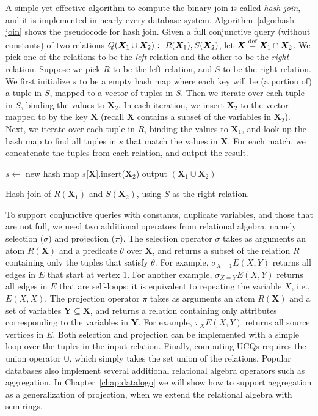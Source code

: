 A simple yet effective algorithm to compute the binary join is called {\em hash join},
 and it is implemented in nearly every database system.
Algorithm~\ref{algo:hash-join} shows the pseudocode for hash join.
Given a full conjunctive query (without constants) 
 of two relations $Q({\bm X_1} \cup {\bm X_2}) \text{ :- } R({\bm X_1}), S({\bm X_2})$,
 let ${\bm X} \stackrel{\text{def}}{=} {\bm X_1} \cap {\bm X_2}$.
We pick one of the relations to be the {\em left} relation and the other to be the {\em right} relation.
Suppose we pick $R$ to be the left relation, and $S$ to be the right relation.
We first initialize $s$ to be a empty hash map
 where each key will be (a portion of) a tuple in $S$,
 mapped to a vector of tuples in $S$.
Then we iterate over each tuple in $S$, 
 binding the values to ${\bm X_2}$.
In each iteration,
 we insert ${\bm X_2}$ to the vector mapped to by the key ${\bm X}$ (recall ${\bm X}$ contains a subset of the variables in ${\bm X_2}$).
Next, we iterate over each tuple in $R$,
 binding the values to ${\bm X_1}$,
 and look up the hash map to find all tuples in $s$ that match the values in ${\bm X}$.
For each match, we concatenate the tuples from each relation,
 and output the result.
%
\begin{algorithm}[th]
    $s \gets$ new hash map\;
    {
        $s$[${\bm X}$].insert(${\bm X_2}$)\;
    }
    {
        {
            output $({\bm X_1}\cup {\bm X_2})$\;
        }
    }
    \caption{Hash join of $R({\bm X_1})$ and $S({\bm X_2})$, using $S$ as the right relation.}
    \label{algo:hash-join}
\end{algorithm}

To support conjunctive queries with constants, 
 duplicate variables, and those that are not full,
 we need two additional operators from relational algebra, 
 namely selection ($\sigma$) and projection ($\pi$).
The selection operator $\sigma$ takes as arguments an atom $R({\bm X})$
 and a predicate $\theta$ over ${\bm X}$,
 and returns a subset of the relation $R$ containing only the tuples that satisfy $\theta$.
For example, $\sigma_{X = 1}E(X, Y)$ returns all edges in $E$ that start at vertex 1.
For another example, $\sigma_{X = Y}E(X, Y)$ returns all edges in $E$ that are self-loops;
 it is equivalent to repeating the variable $X$, i.e., $E(X, X)$.
The projection operator $\pi$ takes as arguments an atom $R({\bm X})$
 and a set of variables ${\bm Y} \subseteq {\bm X}$,
 and returns a relation containing only attributes corresponding 
 to the variables in ${\bm Y}$.
For example, $\pi_{X}E(X, Y)$ returns all source vertices in $E$.
Both selection and projection can be implemented with a simple loop over the tuples in the input relation.
Finally, computing UCQs requires the union operator $\cup$,
 which simply takes the set union of the relations.
Popular databases also implement several additional relational algebra operators 
 such as aggregation.
In Chapter~\ref{chap:datalogo} we will show how to support aggregation
 as a generalization of projection, 
 when we extend the relational algebra with semirings.

